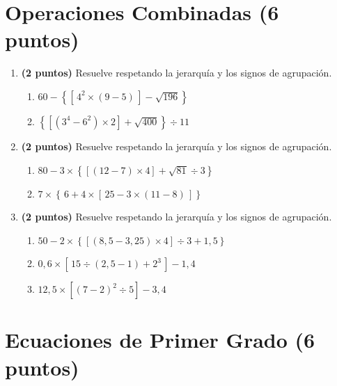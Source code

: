 \documentclass[12pt, letterpaper]{article}
\begin{document}
\section{Operaciones Combinadas (6 puntos)}

\begin{enumerate}[leftmargin=*, resume]

  \item \textbf{(2 puntos)} Resuelve respetando la jerarquía y los signos de agrupación.
        \begin{enumerate}[label=\alph*), leftmargin=*]
          \item $60 - \left\{\left[\,4^2 \times (9 - 5)\,\right] - \sqrt{196}\right\}$
          \item $\left\{\left[(3^4 - 6^2) \times 2\right] + \sqrt{400}\right\} \div 11$
        \end{enumerate}

  \item \textbf{(2 puntos)} Resuelve respetando la jerarquía y los signos de agrupación.
        \begin{enumerate}[label=\alph*), leftmargin=*]
          \item $80 - 3 \times \left\{\left[(12 - 7) \times 4\right] + \sqrt{81} \div 3\right\}$
          \item $7 \times \left\{\,6 + 4 \times \left[\,25 - 3 \times (11 - 8)\,\right]\right\}$
        \end{enumerate}

  \item \textbf{(2 puntos)} Resuelve respetando la jerarquía y los signos de agrupación.
        \begin{enumerate}[label=\alph*), leftmargin=*]
          \item $50 - 2 \times \left\{\left[(8{,}5 - 3{,}25) \times 4\right] \div 3 + 1{,}5\right\}$
          \item $0{,}6 \times \left[\,15 \div (2{,}5 - 1) + 2^3\,\right] - 1{,}4$
          \item $12{,}5 \times \left[(7 - 2)^2 \div 5\right] - 3{,}4$
        \end{enumerate}

\end{enumerate}

\newpage

\section{Ecuaciones de Primer Grado (6 puntos)}
\end{document}
